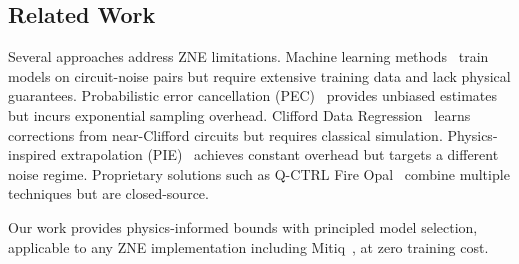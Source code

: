 \subsection{Related Work}

Several approaches address ZNE limitations. Machine learning methods~\cite{Liao2024, Wang2026, Strikis2021} train models on circuit-noise pairs but require extensive training data and lack physical guarantees. Probabilistic error cancellation (PEC)~\cite{Temme2017, vandenBerg2023} provides unbiased estimates but incurs exponential sampling overhead. Clifford Data Regression~\cite{Czarnik2021, Lowe2021} learns corrections from near-Clifford circuits but requires classical simulation. Physics-inspired extrapolation (PIE)~\cite{DiezValle2025} achieves constant overhead but targets a different noise regime. Proprietary solutions such as Q-CTRL Fire Opal~\cite{Mundada2023} combine multiple techniques but are closed-source.

Our work provides physics-informed bounds with principled model selection, applicable to any ZNE implementation including Mitiq~\cite{LaRose2022}, at zero training cost.
